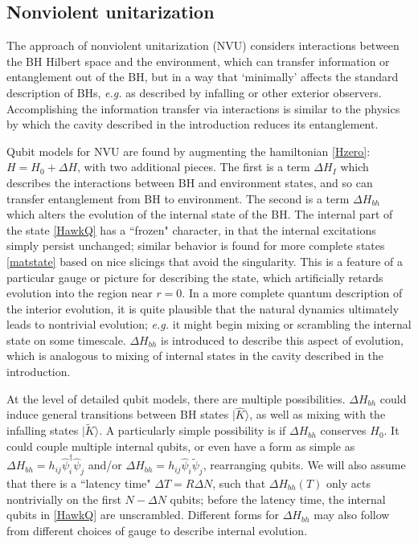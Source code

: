 \documentclass[11pt]{article}
\numberwithin{equation}{section}
\begin{document}
\subsection{Nonviolent unitarization}

The approach of nonviolent unitarization\cite{SGmodels,NVNL,NVUEFT,NVNLT}\cite{NVU,BHQU} (NVU)  considers interactions between the BH Hilbert space and the environment, which can transfer information or entanglement out of the BH, but in a way that `minimally' affects the standard description of BHs, {\it e.g.} as described by infalling or other exterior observers.  Accomplishing the information transfer via interactions is similar to the physics by which the cavity described in the introduction reduces its entanglement.

Qubit models for NVU are found by augmenting the hamiltonian \eqref{Hzero}: $H=H_0+\Delta H$, with two additional pieces.  The first is a term $\Delta H_I$ which describes the interactions between BH and environment states, and so can transfer entanglement from BH to environment.  The second is a term $\Delta H_{bh}$ which alters the evolution of the internal state of the BH.  The internal part of the state \eqref{HawkQ} has a ``frozen" character, in that the internal excitations simply persist unchanged; similar behavior is found for more complete states \eqref{matstate} based on nice slicings that avoid the singularity\cite{SEHS,SE2d}\cite{GiPe1}.  This is a feature of a particular gauge or picture for describing the state, which artificially retards evolution into the region near $r=0$.  In a more complete quantum description of the interior evolution, it is quite plausible that the natural dynamics ultimately leads to nontrivial evolution; {\it e.g.} it might begin mixing or scrambling the internal state on some timescale.  $\Delta H_{bh}$ is introduced to describe this aspect of evolution, which is analogous to mixing of internal states in the cavity described in the introduction.

At the level of detailed qubit models, there are multiple possibilities.  $\Delta H_{bh}$ could induce general transitions  between BH states $|\hat K\rangle$, as well as mixing with the infalling states 
 $|\tilde K\rangle$.  A particularly simple possibility is if $\Delta H_{bh}$ conserves $H_0$.  It could couple multiple internal qubits, or even have a form as simple as $\Delta H_{bh}=h_{ij} \hat \psi^\dagger_i \hat \psi_j$ and/or $\Delta H_{bh}=h_{ij} \hat \psi_i \tilde \psi_j$, rearranging qubits.  We will also assume that there is a ``latency time" $\Delta T= R\Delta N$, such that $\Delta H_{bh}(T)$ only acts nontrivially on the first $N-\Delta N$ qubits; before the latency time, the internal qubits in \eqref{HawkQ} are unscrambled.  Different forms for $\Delta H_{bh}$ may also follow from different choices of gauge to describe internal evolution.  
\end{document}

